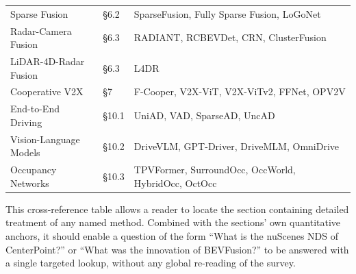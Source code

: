 \documentclass{article}
\begin{document}
\begin{table}[t]
\begin{tabular}{>{\raggedright\arraybackslash}p{0.2737\linewidth}
  >{\raggedright\arraybackslash}p{0.0737\linewidth}
  >{\raggedright\arraybackslash}p{0.6526\linewidth}}
Sparse Fusion & §6.2 & SparseFusion, Fully Sparse Fusion, LoGoNet \\
Radar-Camera Fusion & §6.3 & RADIANT, RCBEVDet, CRN, ClusterFusion \\
LiDAR-4D-Radar Fusion & §6.3 & L4DR \\
Cooperative V2X & §7 & F-Cooper, V2X-ViT, V2X-ViTv2, FFNet, OPV2V \\
End-to-End Driving & §10.1 & UniAD, VAD, SparseAD, UncAD \\
Vision-Language Models & §10.2 & DriveVLM, GPT-Driver, DriveMLM, OmniDrive \\
Occupancy Networks & §10.3 & TPVFormer, SurroundOcc, OccWorld, HybridOcc, OctOcc \\
\end{tabular}
\end{table}

This cross-reference table allows a reader to locate the section containing detailed treatment of any named method. Combined with the sections' own quantitative anchors, it should enable a question of the form ``What is the nuScenes NDS of CenterPoint?'' or ``What was the innovation of BEVFusion?'' to be answered with a single targeted lookup, without any global re-reading of the survey.



\end{document}
